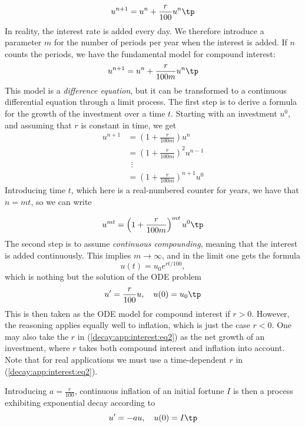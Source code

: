 \documentclass[graybox,sectrefs,envcountresetchap,open=right,final]{svmonodo}
\begin{document}
\[ u^{n+1} = u^n + \frac{r}{100}u^n
\tp  \]
In reality, the interest rate is added every day. We therefore introduce
a parameter $m$ for the number of periods per year when the interest
is added. If $n$ counts the periods, we have the fundamental model
for compound interest:
\begin{equation}
u^{n+1} = u^n + \frac{r}{100 m}u^n
\tp
\label{decay:app:interest:eq1}
\end{equation}
This model is a \emph{difference equation}, but it can be transformed to a
continuous differential equation through a limit process.
The first step is to derive a formula for the growth of the investment
over a time $t$.
Starting with an investment $u^0$, and assuming that $r$ is constant in time,
we get
\begin{align*}
u^{n+1} &= \left(1 + \frac{r}{100 m}\right)u^{n}\\ 
&= \left(1 + \frac{r}{100 m}\right)^2u^{n-1}\\ 
&\ \ \vdots\\ 
&= \left(1 +\frac{r}{100 m}\right)^{n+1}u^{0}
\end{align*}
Introducing time $t$, which here is a real-numbered counter for years,
we have that $n=mt$, so we can write

\[ u^{mt} = \left(1 + \frac{r}{100 m}\right)^{mt} u^0\tp  \]
The second step is to assume \emph{continuous compounding}, meaning that the
interest is added continuously. This implies $m\rightarrow\infty$, and
in the limit one gets the formula
\begin{equation}
u(t) = u_0e^{rt/100},
\end{equation}
which is nothing but the solution of the ODE problem
\begin{equation}
u^{\prime} = \frac{r}{100}u,\quad u(0)=u_0
\tp
\label{decay:app:interest:eq2}
\end{equation}
This is then taken as the ODE model for compound interest if $r>0$.
However, the reasoning applies equally well to inflation, which is
just the case $r < 0$.
One may also take the $r$ in (\ref{decay:app:interest:eq2})
as the net growth of an investment, where $r$ takes both compound interest
and inflation into account. Note that for real applications we must
use a time-dependent $r$ in (\ref{decay:app:interest:eq2}).


Introducing $a=\frac{r}{100}$, continuous inflation of an initial
fortune $I$ is then
a process exhibiting exponential decay according to
\[ u^{\prime} = -au,\quad u(0)=I\tp  \]
\end{document}
